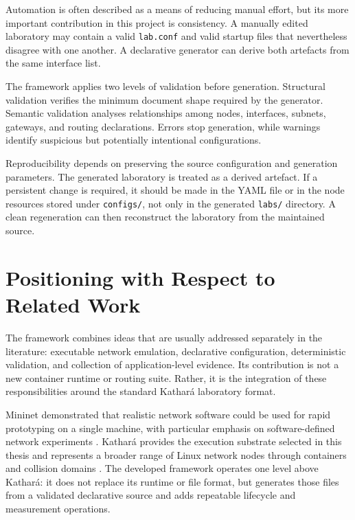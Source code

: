 Automation is often described as a means of reducing manual effort, but its
more important contribution in this project is consistency. A manually edited
laboratory may contain a valid \texttt{lab.conf} and valid startup files that
nevertheless disagree with one another. A declarative generator can derive
both artefacts from the same interface list.

The framework applies two levels of validation before generation. Structural
validation verifies the minimum document shape required by the generator.
Semantic validation analyses relationships among nodes, interfaces, subnets,
gateways, and routing declarations. Errors stop generation, while warnings
identify suspicious but potentially intentional configurations.

Reproducibility depends on preserving the source configuration and generation
parameters. The generated laboratory is treated as a derived artefact. If a
persistent change is required, it should be made in the YAML file or in the
node resources stored under \texttt{configs/}, not only in the generated
\texttt{labs/} directory. A clean regeneration can then reconstruct the
laboratory from the maintained source.

\section{Positioning with Respect to Related Work}
\label{sec:related-work-positioning}

The framework combines ideas that are usually addressed separately in the
literature: executable network emulation, declarative configuration,
deterministic validation, and collection of application-level evidence. Its
contribution is not a new container runtime or routing suite. Rather, it is the
integration of these responsibilities around the standard Kathar\'a laboratory
format.

Mininet demonstrated that realistic network software could be used for rapid
prototyping on a single machine, with particular emphasis on software-defined
network experiments \cite{lantz2010network}. Kathar\'a provides the execution
substrate selected in this thesis and represents a broader range of Linux
network nodes through containers and collision domains
\cite{bonofiglio2018kathara,scazzariello2020kathara}. The developed framework
operates one level above Kathar\'a: it does not replace its runtime or file
format, but generates those files from a validated declarative source and adds
repeatable lifecycle and measurement operations.

